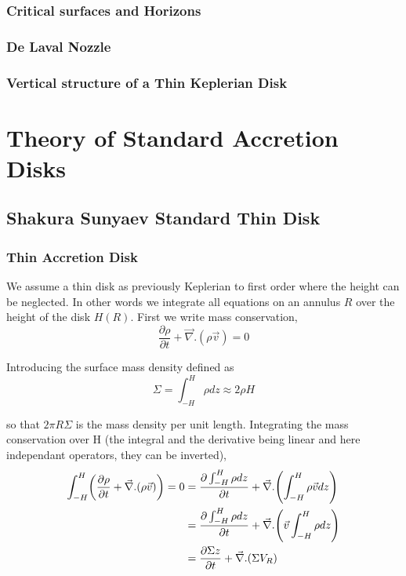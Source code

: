 \documentclass[10pt,a4paper,english,draft]{article}
\let\originalleft\left
\let\originalright\right
\renewcommand{\left}{\mathopen{}\mathclose\bgroup\originalleft}
\renewcommand{\right}{\aftergroup\egroup\originalright}
\begin{document}
\subsubsection{Critical surfaces and Horizons}
\subsubsection{De Laval Nozzle}
\subsubsection{Vertical structure of a Thin Keplerian Disk}

\section{Theory of Standard Accretion Disks}

\subsection{Shakura Sunyaev Standard Thin Disk}

\subsubsection{Thin Accretion Disk}

We assume a thin disk as previously Keplerian to first order where the height
can be neglected. In other words we integrate all equations on an annulus $R$
over the height of the disk $H(R)$. First we write mass conservation,
\begin{equation*}
    \frac{\partial \rho}{\partial t} + \vec{\nabla}.(\rho \vec{v}) = 0
\end{equation*}

Introducing the surface mass density defined as
\begin{equation*}
    \Sigma = \int_{-H}^H \rho dz \approx 2 \rho H
\end{equation*}

so that $2 \pi R \Sigma$ is the mass density per unit length. Integrating the
mass conservation over H (the integral and the derivative being linear and here
independant operators, they can be inverted),
\begin{align*}
    \int_{-H}^H \left( \frac{\partial \rho}{\partial t} + \vec{\nabla}.(\rho \vec{v}) \right) = 0 %
    &= \frac{\partial \int_{-H}^H \rho dz}{\partial t} + \vec{\nabla}.\left( \int_{-H}^H \rho \vec{v} dz \right) \\
    &= \frac{\partial \int_{-H}^H \rho dz}{\partial t} + \vec{\nabla}.\left( \vec{v} \int_{-H}^H \rho dz \right) \\
    &= \frac{\partial \Sigma z}{\partial t} + \vec{\nabla}.(\Sigma V_R)
\end{align*}
\end{document}

